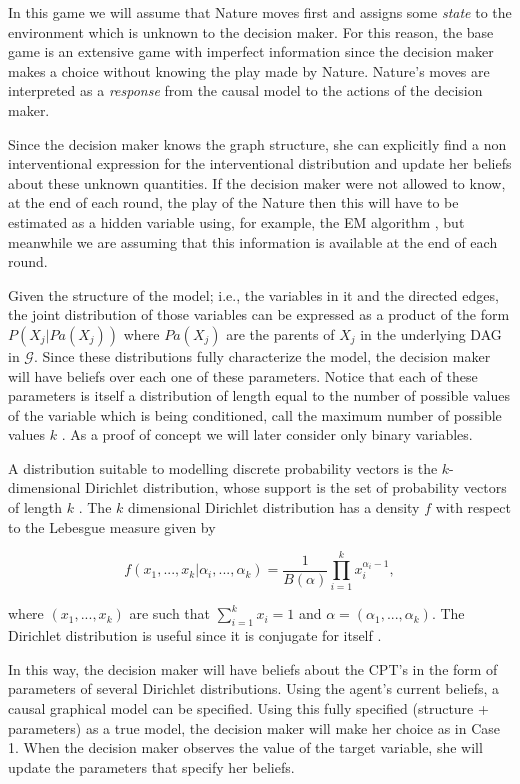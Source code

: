\documentclass{article}
\begin{document}
In this game we will assume that Nature moves first and assigns some \textit{state} to the environment which is unknown to the decision maker. For this reason, the base game is an extensive game with imperfect information since the decision maker makes a choice without knowing the play made by Nature. Nature's moves are interpreted as a \textit{response} from the causal model to the actions of the decision maker.

Since the decision maker knows the graph structure, she can explicitly find a non interventional expression for the interventional distribution and update her beliefs about these unknown quantities. If the decision maker were not allowed to know, at the end of each round, the play of the Nature then this will have to be estimated as a hidden variable using, for example, the EM algorithm \cite{dempster1977maximum}, but meanwhile we are assuming that this information is available at the end of each round.

Given the structure of the model; i.e., the variables in it and the directed edges, the joint distribution of those variables can be expressed as a product of the form $P(X_j | Pa(X_j))$ where $Pa(X_j)$ are the parents of $X_j$ in the underlying DAG in $\mathcal{G}$. Since these distributions fully characterize the model, the decision maker will have beliefs over each one of these parameters. Notice that each of these parameters is itself a distribution of length equal to the number of possible values of the variable which is being conditioned, call the maximum number of possible values $k$ . As a proof of concept we will later consider only binary variables.

A distribution suitable to modelling discrete probability vectors is the $k$-dimensional Dirichlet distribution, whose support is the set of probability vectors of length $k$ \cite{hjort2010bayesian}. The $k$ dimensional Dirichlet distribution has a density $f$ with respect to the Lebesgue measure given by

\[ f(x_1,...,x_k | \alpha_i,...,\alpha_k)=\frac{1}{B(\alpha)}  \prod_{i=1}^k x_i^{\alpha_i-1},\]

where $(x_1,...,x_k)$ are such that $\sum_{i=1}^k x_i =1$ and $\alpha=(\alpha_1,...,\alpha_k)$. The Dirichlet distribution is useful since it is conjugate for itself \cite{bernardo2000bayesian}.

In this way, the decision maker will have beliefs about the CPT's in the form of parameters of several Dirichlet distributions. Using the agent's current beliefs, a causal graphical model can be specified. Using this fully specified (structure + parameters) as a true model, the decision maker will make her choice as in Case 1. When the decision maker observes the value of the target variable, she will update the parameters that specify her beliefs.
\end{document}
